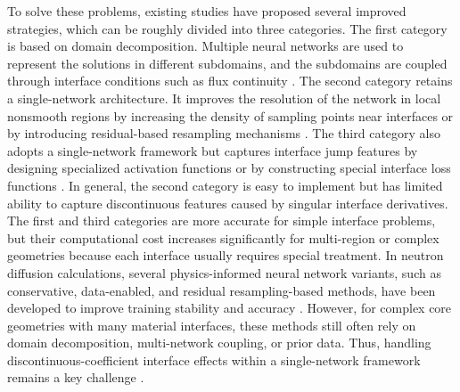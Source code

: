 \documentclass[final,3p,times,sort&compress]{elsarticle}
\begin{document}
To solve these problems, existing studies have proposed several improved strategies, which can be roughly divided into three categories. The first category is based on domain decomposition. Multiple neural networks are used to represent the solutions in different subdomains, and the subdomains are coupled through interface conditions such as flux continuity \cite{jagtap2020conservative,he2022meshfree,wu2022inn}. The second category retains a single-network architecture. It improves the resolution of the network in local nonsmooth regions by increasing the density of sampling points near interfaces or by introducing residual-based resampling mechanisms \cite{xie2022weighted,xie2021neural}. The third category also adopts a single-network framework but captures interface jump features by designing specialized activation functions \cite{sarma2024interface} or by constructing special interface loss functions \cite{yao2023deep,tseng2023cuspcapturing,li2025two}.
In general, the second category is easy to implement but has limited ability to capture discontinuous features caused by singular interface derivatives. The first and third categories are more accurate for simple interface problems, but their computational cost increases significantly for multi-region or complex geometries because each interface usually requires special treatment. In neutron diffusion calculations, several physics-informed neural network variants, such as conservative, data-enabled, and residual resampling-based methods, have been developed to improve training stability and accuracy \cite{wang2022surrogate,yang2023physicsconstrained,yang2023dataenabled,heng2026residual}. However, for complex core geometries with many material interfaces, these methods still often rely on domain decomposition, multi-network coupling, or prior data. Thus, handling discontinuous-coefficient interface effects within a single-network framework remains a key challenge \cite{xie2024physicsspecialized,liu2024discontinuity}.
\end{document}

